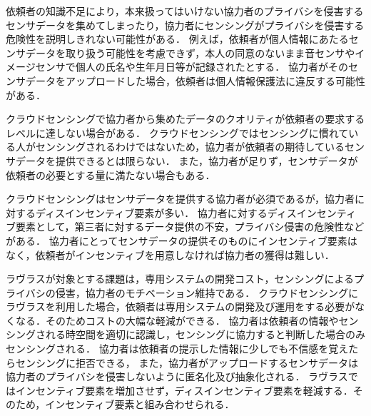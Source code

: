 依頼者の知識不足により，本来扱ってはいけない協力者のプライバシを侵害するセンサデータを集めてしまったり，協力者にセンシングがプライバシを侵害する危険性を説明しきれない可能性がある．
例えば，依頼者が個人情報にあたるセンサデータを取り扱う可能性を考慮できず，本人の同意のないまま音センサやイメージセンサで個人の氏名や生年月日等が記録されたとする．
協力者がそのセンサデータをアップロードした場合，依頼者は個人情報保護法に違反する可能性がある．

クラウドセンシングで協力者から集めたデータのクオリティが依頼者の要求するレベルに達しない場合がある．
クラウドセンシングではセンシングに慣れている人がセンシングされるわけではないため，協力者が依頼者の期待しているセンサデータを提供できるとは限らない．
また，協力者が足りず，センサデータが依頼者の必要とする量に満たない場合もある．

クラウドセンシングはセンサデータを提供する協力者が必須であるが，協力者に対するディスインセンティブ要素が多い．
協力者に対するディスインセンティブ要素として，第三者に対するデータ提供の不安，プライバシ侵害の危険性などがある．
協力者にとってセンサデータの提供そのものにインセンティブ要素はなく，依頼者がインセンティブを用意しなければ協力者の獲得は難しい．

ラヴラスが対象とする課題は，専用システムの開発コスト，センシングによるプライバシの侵害，協力者のモチベーション維持である．
クラウドセンシングにラヴラスを利用した場合，依頼者は専用システムの開発及び運用をする必要がなくなる．そのためコストの大幅な軽減ができる．
協力者は依頼者の情報やセンシングされる時空間を適切に認識し，センシングに協力すると判断した場合のみセンシングされる．
協力者は依頼者の提示した情報に少しでも不信感を覚えたらセンシングに拒否できる，
また，協力者がアップロードするセンサデータは協力者のプライバシを侵害しないように匿名化及び抽象化される．
ラヴラスではインセンティブ要素を増加させず，ディスインセンティブ要素を軽減する．そのため，インセンティブ要素と組み合わせられる．





